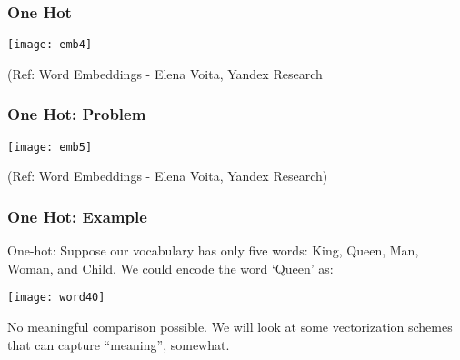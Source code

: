 




\begin{frame}[fragile]\frametitle{One Hot}
\begin{center}
\texttt{[image: emb4]}
\end{center}

{\tiny (Ref: Word Embeddings - Elena Voita, Yandex Research}
\end{frame}


\begin{frame}[fragile]\frametitle{One Hot: Problem}
\begin{center}
\texttt{[image: emb5]}
\end{center}

{\tiny (Ref: Word Embeddings - Elena Voita, Yandex Research)}
\end{frame}

\begin{frame}[fragile]\frametitle{One Hot: Example}
One-hot:  Suppose our vocabulary has only five words: King, Queen, Man, Woman, and Child. We could encode the word `Queen' as:
\begin{center}
\texttt{[image: word40]}
\end{center}
No meaningful comparison possible. We will look at some vectorization schemes that can capture ``meaning'', somewhat.
\end{frame}

